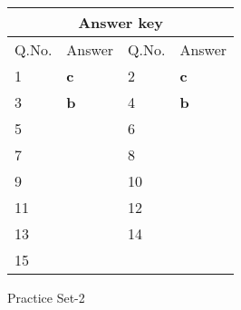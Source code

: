 \begin{table}[H]
	\centering
	\begin{tabular}{|p{1.5cm}|p{1.5cm}||p{1.5cm}|p{1.5cm}|}
		\hline
		\multicolumn{4}{|c|}{\textbf{Answer key}}\\\hline\hline
		\rowcolor{ocrel}Q.No.&Answer&Q.No.&Answer\\\hline
		1&\textbf{c} &2&\textbf{c}\\\hline 
		3&\textbf{b} &4&\textbf{b} \\\hline
		5&\textbf{} &6&\textbf{} \\\hline
		7&\textbf{}&8&\textbf{}\\\hline
		9&\textbf{}&10&\textbf{}\\\hline
		11&\textbf{} &12&\textbf{}\\\hline
		13&\textbf{}&14&\textbf{}\\\hline
		15&\textbf{}& &\\\hline
		
	\end{tabular}
\end{table}
\newpage
\begin{abox}
	Practice Set-2
\end{abox}
